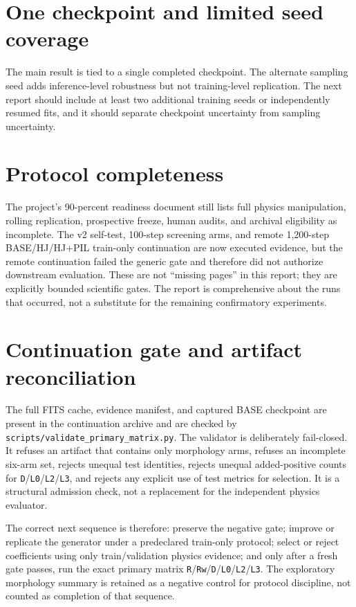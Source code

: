 \documentclass[11pt,oneside]{report}
\begin{document}
\section{One checkpoint and limited seed coverage}

The main result is tied to a single completed checkpoint. The alternate sampling seed adds inference-level robustness but not training-level replication. The next report should include at least two additional training seeds or independently resumed fits, and it should separate checkpoint uncertainty from sampling uncertainty.

\section{Protocol completeness}

The project’s 90-percent readiness document still lists full physics manipulation, rolling replication, prospective freeze, human audits, and archival eligibility as incomplete. The v2 self-test, 100-step screening arms, and remote 1,200-step BASE/HJ/HJ+PIL train-only continuation are now executed evidence, but the remote continuation failed the generic gate and therefore did not authorize downstream evaluation. These are not “missing pages” in this report; they are explicitly bounded scientific gates. The report is comprehensive about the runs that occurred, not a substitute for the remaining confirmatory experiments.

\section{Continuation gate and artifact reconciliation}

The full FITS cache, evidence manifest, and captured BASE checkpoint are present in the continuation archive and are checked by \texttt{scripts/validate\_primary\_matrix.py}. The validator is deliberately fail-closed. It refuses an artifact that contains only morphology arms, refuses an incomplete six-arm set, rejects unequal test identities, rejects unequal added-positive counts for \texttt{D}/\texttt{L0}/\texttt{L2}/\texttt{L3}, and rejects any explicit use of test metrics for selection. It is a structural admission check, not a replacement for the independent physics evaluator.

The correct next sequence is therefore: preserve the negative gate; improve or replicate the generator under a predeclared train-only protocol; select or reject coefficients using only train/validation physics evidence; and only after a fresh gate passes, run the exact primary matrix \texttt{R}/\texttt{Rw}/\texttt{D}/\texttt{L0}/\texttt{L2}/\texttt{L3}. The exploratory morphology summary is retained as a negative control for protocol discipline, not counted as completion of that sequence.
\end{document}
